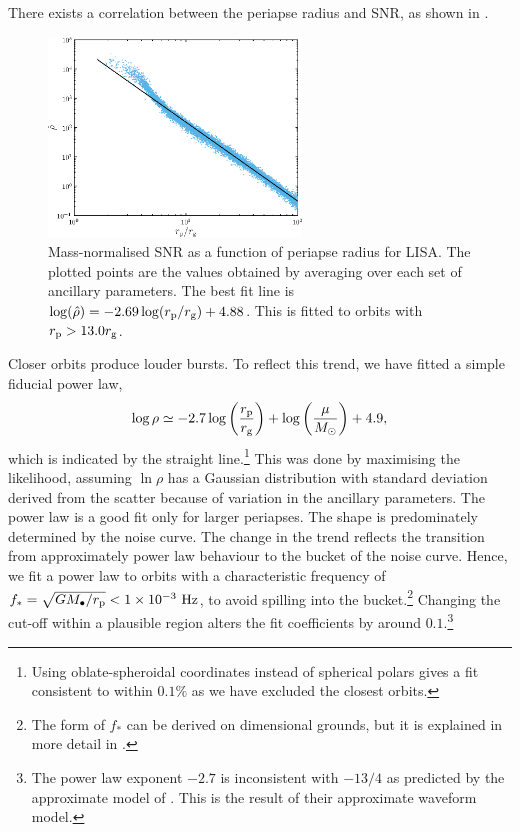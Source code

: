 There exists a correlation between the periapse radius and SNR, as shown in .
\begin{figure}%
  \centering
  \includegraphics[width=0.6\textwidth]{./images/Fig_SNR}
    \caption{Mass-normalised SNR as a function of periapse radius for LISA. The plotted points are the values obtained by averaging over each set of ancillary parameters. The best fit line is $\log(\hat{\rho}) = -2.69\log(r_\mathrm{p}/r_\mathrm{g}) + 4.88$. This is fitted to orbits with $r_\mathrm{p} >  13.0 r_\mathrm{g}$.} %
  \label{fig:SNR}
\end{figure}
Closer orbits produce louder bursts. To reflect this trend, we have fitted a simple fiducial power law,
\begin{equation}
\log\rho \simeq -2.7\log\left(\dfrac{r_\mathrm{p}}{r_\mathrm{g}}\right) + \log\left(\dfrac{\mu}{M_\odot}\right) + 4.9,
\label{eq:SNR-power-law}
\end{equation}
which is indicated by the straight line.\footnote{Using oblate-spheroidal coordinates instead of spherical polars gives a fit consistent to within $0.1\%$ as we have excluded the closest orbits.} This was done by maximising the likelihood, assuming $\ln \rho$ has a Gaussian distribution with standard deviation derived from the scatter because of variation in the ancillary parameters. The power law is a good fit only for larger periapses. The shape is predominately determined by the noise curve. The change in the trend reflects the transition from approximately power law behaviour to the bucket of the noise curve. Hence, we fit a power law to orbits with a characteristic frequency of $f_\ast = \sqrt{GM_\bullet/r_\mathrm{p}} < 1 \times 10^{-3}~\mathrm{Hz}$, to avoid spilling into the bucket.\footnote{The form of $f_\ast$ can be derived on dimensional grounds, but it is explained in more detail in .} Changing the cut-off within a plausible region alters the fit coefficients by around $0.1$.\footnote{The power law exponent $-2.7$ is inconsistent with $-13/4$ as predicted by the approximate model of \citet{Hopman2007}. This is the result of their approximate waveform model.}


